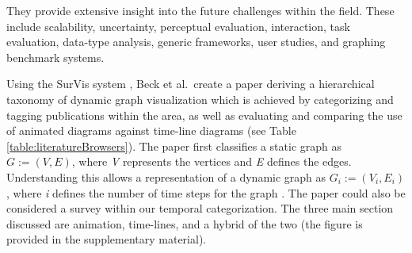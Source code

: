 %
%
%

They provide extensive insight into the future challenges within the field. These include scalability, uncertainty, perceptual evaluation, interaction, task evaluation, data-type analysis, generic frameworks, user studies, and graphing benchmark systems.

Using the SurVis system \cite{beck2016visual}, Beck et al.\ create a paper deriving a hierarchical taxonomy of dynamic graph visualization which is achieved by categorizing and tagging publications within the area, as well as evaluating and comparing the use of animated diagrams against time-line diagrams (see Table \ref{table:literatureBrowsers}). The paper first classifies a static graph as $G := (V,E)$, where \textit{V} represents the vertices and \textit{E} defines the edges. Understanding this allows a representation of a dynamic graph as $G_{i} := (V_{i}, E_{i})$, where \textit{i} defines the number of time steps for the graph \cite{beck2014state}. The paper could also be considered a survey within our temporal categorization.
The three main section discussed are animation, time-lines, and a hybrid of the two  (the figure is provided in the supplementary material).

